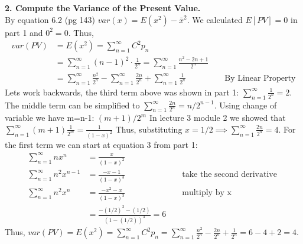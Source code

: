 \documentclass[12pt]{article}
\newenvironment{problem}[3][Problem]{\begin{trivlist}
\item[\hskip \labelsep {\bfseries #1}\hskip \labelsep {\bfseries #2.}]}{\end{trivlist}}
\newcommand{\infsum}{\sum_{n=1}^{\infty }}
\begin{document}
\begin{problem}{3 (20 points)}
\newpage
\textbf{2. Compute the Variance of the Present Value. }\\
By equation 6.2 (pg 143) $var(x) = E(x^2) - \bar{x}^2$. We calculated $E[PV] = 0$ in part 1 and $0^2=0$. Thus, 
\begin{align*}
var(PV) &= E(x^2) = \infsum C^2 p_n \\ 
&= \infsum(n-1)^2 \cdot \frac{1}{2^n} = \infsum \frac{n^2 - 2n +1}{2^n} \\ 
&= \infsum \frac{n^2}{2^n} - \infsum \frac{2n}{2^n} + \infsum \frac{1}{2^n}&& \text{ By Linear Property} 
\end{align*} 
Lets work backwards, the third term above was shown in part 1: $\infsum \frac{1}{2^n} =2$. The middle term can be simplified to $\infsum \frac{2n}{2^n} = n/2^{n-1}$. Using change of variable we have m=n-1: $(m+1)/2^m$ In lecture 3 module 2 we showed that $\infsum (m+1)\frac{1}{2^m} = \frac{1}{(1-x)^2}$ Thus, substituting $x=1/2 \implies \infsum \frac{2n}{2^n} = 4 $. For the first term we can start at equation 3 from part 1: 
\begin{align*}
  \infsum nx^{n} &= \frac{x}{(1-x)^2} \\
  \infsum n^2x^{n-1} &= \frac{-x-1}{(1-x)^3} &&\text{ take the second derivative } \\
  \infsum n^2x^{n} &= \frac{-x^2-x}{(1-x)^3} &&\text{ multiply by x} \\
  &= \frac{-(1/2)^2-(1/2)}{(1-(1/2))^3} = 6
\end{align*}
Thus, $var(PV) = E(x^2) = \infsum C^2 p_n = \infsum \frac{n^2}{2^n} - \frac{2n}{2^n} + \frac{1}{2^n} = 6-4+2=4.$
\end{problem}
\end{document}
